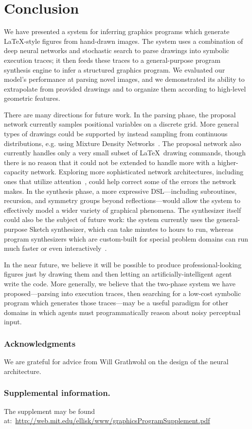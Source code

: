 \documentclass{article}
\begin{document}
\section{Conclusion}

We have presented a system for inferring graphics programs which generate \LaTeX-style figures from hand-drawn images. The system uses a combination of deep neural networks and stochastic search to parse drawings into symbolic execution traces; it then feeds these traces to a general-purpose program synthesis engine to infer a structured graphics program. We evaluated our model's performance at parsing novel images, and we demonstrated its ability to extrapolate from provided drawings and to organize them according to high-level geometric features.

There are many directions for future work. In the parsing phase, the proposal network currently samples positional variables on a discrete grid. More general types of drawings could be supported by instead sampling from continuous distributions, e.g. using Mixture Density Networks~\cite{MDN}. The proposal network also currently handles only a very small subset of \LaTeX~drawing commands, though there is no reason that it could not be extended to handle more with a higher-capacity network. Exploring more sophisticated network architectures, including ones that utilize attention~\cite{mnih2014recurrent}, could help correct some of the errors the network makes.
In the synthesis phase, a more expressive DSL---including subroutines, recursion, and symmetry groups beyond reflections---would allow the system to effectively model a wider variety of graphical phenomena. The synthesizer itself could also be the subject of future work: the system currently uses the general-purpose Sketch synthesizer, which can take minutes to hours to run, whereas program synthesizers which are custom-built for special problem domains can run much faster or even interactively~\cite{le2014flashextract}.

In the near future, we believe it will be possible to produce professional-looking figures just by drawing them and then letting an artificially-intelligent agent write the code.
More generally, we believe that the two-phase system we have proposed---parsing into execution traces, then searching for a low-cost symbolic program which generates those traces---may be a useful paradigm for other domains in which agents must programmatically reason about noisy perceptual input.


\subsubsection*{Acknowledgments} We are grateful for advice from Will Grathwohl on the design of the neural architecture.

\subsubsection*{Supplemental information.} The supplement may be found at:~\url{http://web.mit.edu/ellisk/www/graphicsProgramSupplement.pdf}


%


 {\small }
\end{document}
